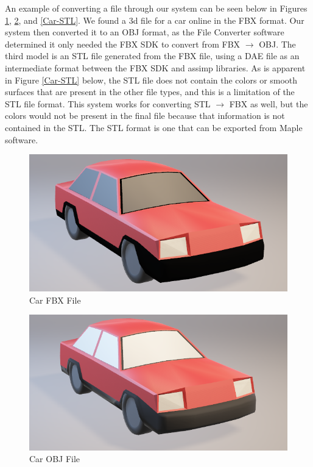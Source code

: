     An example of converting a file through our system can be seen below in Figures \ref{Car-FBX}, \ref{Car-OBJ}, and \ref{Car-STL}. 
    We found a 3d file for a car online in the FBX format. 
    Our system then converted it to an OBJ format, as the File Converter software determined it only needed the FBX SDK to convert from FBX $\rightarrow$ OBJ. 
    The third model is an STL file generated from the FBX file, using a DAE file as an intermediate format between the FBX SDK and assimp libraries. 
    As is apparent in Figure \ref{Car-STL} below, the STL file does not contain the colors or smooth surfaces that are present in the other file types, and this is a limitation of the STL file format. 
    This system works for converting STL $\rightarrow$ FBX as well, but the colors would not be present in the final file because that information is not contained in the STL. The STL format is one that can be exported from Maple software.\\

\begin{figure}[H]
    \centering
    \includegraphics[width=\textwidth]{Car-FBX.png}
    \caption{Car FBX File}
    \label{Car-FBX}
\end{figure}

\begin{figure}[H]
    \centering
    \includegraphics[width=\textwidth]{Car-OBJ.png}
    \caption{Car OBJ File}
    \label{Car-OBJ}
\end{figure}

